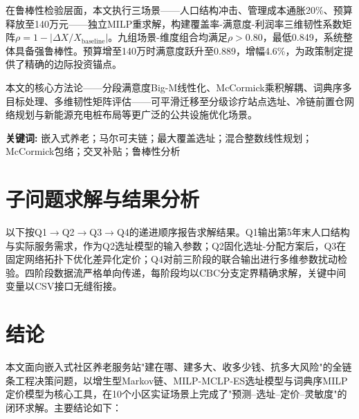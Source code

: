 \documentclass[12pt,a4paper]{ctexart}
\begin{document}
在鲁棒性检验层面，本文执行三场景——人口结构冲击、管理成本通胀20\%、预算释放至140万元——独立MILP重求解，构建覆盖率-满意度-利润率三维韧性系数矩阵$\rho = 1 - |\Delta X / X_{\text{baseline}}|$。九组场景-维度组合均满足$\rho>0.80$，最低0.849，系统整体具备强鲁棒性。预算增至140万时满意度跃升至0.889，增幅4.6\%，为政策制定提供了精确的边际投资锚点。

本文的核心方法论——分段满意度Big-M线性化、McCormick乘积解耦、词典序多目标处理、多维韧性矩阵评估——可平滑迁移至分级诊疗站点选址、冷链前置仓网络规划与新能源充电桩布局等更广泛的公共设施优化场景。

\vspace{6pt}
\noindent\textbf{关键词:} 嵌入式养老；马尔可夫链；最大覆盖选址；混合整数线性规划；McCormick包络；交叉补贴；鲁棒性分析

\newpage









\section{子问题求解与结果分析}

以下按Q1$\to$Q2$\to$Q3$\to$Q4的递进顺序报告求解结果。Q1输出第5年末人口结构与实际服务需求，作为Q2选址模型的输入参数；Q2固化选址-分配方案后，Q3在固定网络拓扑下优化差异化定价；Q4对前三阶段的联合输出进行多维参数扰动检验。四阶段数据流严格单向传递，每阶段均以CBC分支定界精确求解，关键中间变量以CSV接口无缝衔接。













\section{结论}

本文面向嵌入式社区养老服务站"建在哪、建多大、收多少钱、抗多大风险"的全链条工程决策问题，以增生型Markov链、MILP-MCLP-ES选址模型与词典序MILP定价模型为核心工具，在10个小区实证场景上完成了"预测--选址--定价--灵敏度"的闭环求解。主要结论如下：
\end{document}
